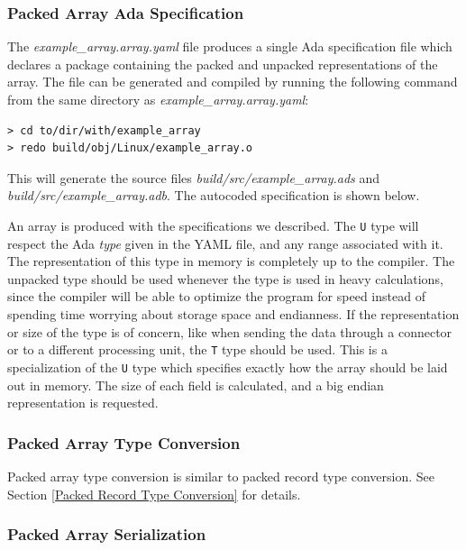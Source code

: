 \subsubsection{Packed Array Ada Specification}

The \textit{example\_array.array.yaml} file produces a single Ada specification file which declares a package containing the packed and unpacked representations of the array. The file can be generated and compiled by running the following command from the same directory as \textit{example\_array.array.yaml}:

\vspace{5mm} %
\begin{verbatim}
> cd to/dir/with/example_array
> redo build/obj/Linux/example_array.o
\end{verbatim}
\vspace{5mm} %

This will generate the source files \textit{build/src/example\_array.ads} and \textit{build/src/example\_array.adb}. The autocoded specification is shown below.


An array is produced with the specifications we described. The \texttt{U} type will respect the Ada \textit{type} given in the YAML file, and any range associated with it. The representation of this type in memory is completely up to the compiler. The unpacked type should be used whenever the type is used in heavy calculations, since the compiler will be able to optimize the program for speed instead of spending time worrying about storage space and endianness. If the representation or size of the type is of concern, like when sending the data through a connector or to a different processing unit, the \texttt{T} type should be used. This is a specialization of the \texttt{U} type which specifies exactly how the array should be laid out in memory. The size of each field is calculated, and a big endian representation is requested.

\subsubsection{Packed Array Type Conversion}

Packed array type conversion is similar to packed record type conversion. See Section \ref{Packed Record Type Conversion} for details.

\subsubsection{Packed Array Serialization}

